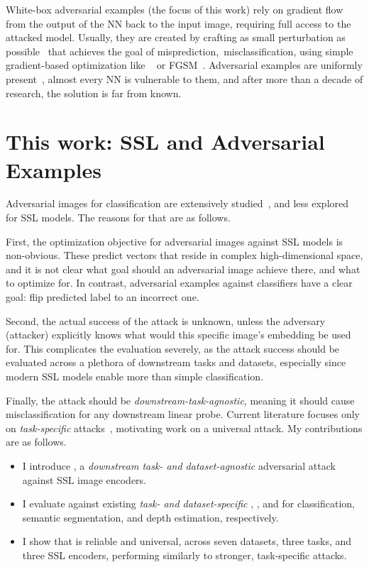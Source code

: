 White-box adversarial examples (the focus of this work) rely on gradient flow from the output of the NN back to the input image, requiring full access to the attacked model. Usually, they are created by crafting as small perturbation as possible~\cite{carliniandwagner} that achieves the goal of misprediction,~\eg misclassification, using simple gradient-based optimization like \PGD~\cite{pgd} or FGSM~\cite{fgsm}. Adversarial examples are uniformly present~\cite{adversarialarenotbugs}, almost every NN is vulnerable to them, and after more than a decade of research, the solution is far from known.

\section{This work: SSL and Adversarial Examples}

Adversarial images for classification are extensively studied~\cite{advex,fgsm,pgd,carliniandwagner,adversarialarenotbugs}, and less explored for SSL models. The reasons for that are as follows. 

First, the optimization objective for adversarial images against SSL models is non-obvious. These predict vectors that reside in complex high-dimensional space, and it is not clear what goal should an adversarial image achieve there, and what to optimize for. In contrast, adversarial examples against classifiers have a clear goal: flip predicted label to an incorrect one.

Second, the actual success of the attack is unknown, unless the adversary (attacker) explicitly knows what would this specific image's embedding be used for. This complicates the evaluation severely, as the attack success should be evaluated across a plethora of downstream tasks and datasets, especially since modern SSL models enable more than simple classification. 

Finally, the attack should be \textit{downstream-task-agnostic}, meaning it should cause misclassification for any downstream linear probe. Current literature focuses only on \textit{task-specific} attacks~\cite{pgd,segpgd}, motivating work on a universal attack. My contributions are as follows.
\begin{itemize}
    \item I introduce \EmbedAttack, a \textit{downstream task- and dataset-agnostic} adversarial attack against SSL image encoders.
    \item I evaluate \EmbedAttack against existing \textit{task- and dataset-specific} \PGD, \SegPGD, and \DepthPGD for classification, semantic segmentation, and depth estimation, respectively.
    \item I show that \EmbedAttack is reliable and universal, across seven datasets, three tasks, and three SSL encoders, performing similarly to stronger, task-specific attacks.
\end{itemize}

